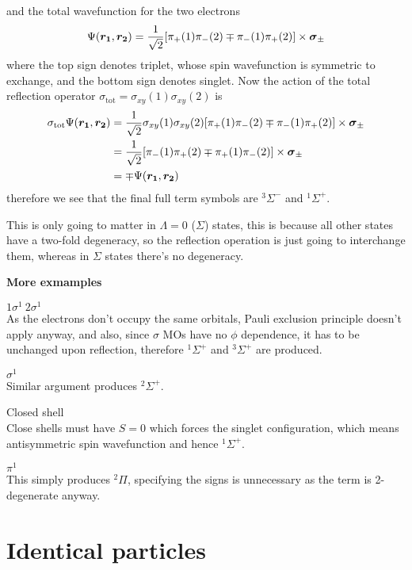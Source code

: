 and the total wavefunction for the two electrons
\begin{equation}
	\Psi(\boldsymbol{r_1},\boldsymbol{r_2})=\frac{1}{\sqrt{2}}[\pi_+(1)\pi_-(2)\mp\pi_-(1)\pi_+(2)]\times\boldsymbol{\sigma}_{\pm}
\end{equation}
where the top sign denotes triplet, whose spin wavefunction is symmetric to exchange, and the bottom sign denotes singlet. Now the action of the total reflection operator $\sigma_{\text{tot}}=\sigma_{xy}(1)\sigma_{xy}(2)$ is
\begin{equation}
\begin{aligned}
	\sigma_{\text{tot}}\Psi(\boldsymbol{r_1},\boldsymbol{r_2})&=\frac{1}{\sqrt{2}}\sigma_{xy}(1)\sigma_{xy}(2)[\pi_+(1)\pi_-(2)\mp\pi_-(1)\pi_+(2)]\times\boldsymbol{\sigma}_{\pm}\\
	&=\frac{1}{\sqrt{2}}[\pi_-(1)\pi_+(2)\mp\pi_+(1)\pi_-(2)]\times\boldsymbol{\sigma}_{\pm}\\
	&=\mp\Psi(\boldsymbol{r_1},\boldsymbol{r_2})
\end{aligned}
\end{equation}
therefore we see that the final full term symbols are $^3\Sigma^-$ and $^1\Sigma^+$. \par
This is only going to matter in $\Lambda=0$ ($\Sigma$) states, this is because all other states have a two-fold degeneracy, so the reflection operation is just going to interchange them, whereas in $\Sigma$ states there's no degeneracy.\par
\textbf{More exmamples}\par
$1\sigma^1\ 2\sigma^1$\\
As the electrons don't occupy the same orbitals, Pauli exclusion principle doesn't apply anyway, and also, since $\sigma$ MOs have no $\phi$ dependence, it has to be unchanged upon reflection, therefore $^1\Sigma^+$ and $^3\Sigma^+$ are produced.\par
$\sigma^1$\\
Similar argument produces $^2\Sigma^+$.\par
Closed shell\\
Close shells must have $S=0$ which forces the singlet configuration, which means antisymmetric spin wavefunction and hence $^1\Sigma^+$.\par
$\pi^1$\\
This simply produces $^2\Pi$, specifying the signs is unnecessary as the term is 2-degenerate anyway.

\section{Identical particles}
